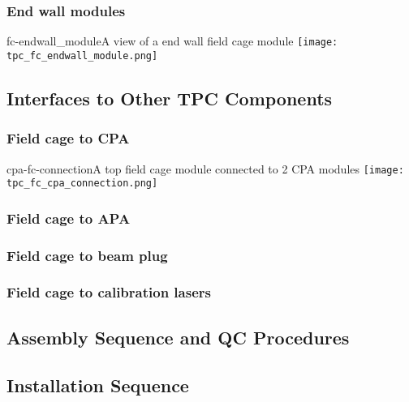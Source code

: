 \subsubsection{End wall modules}

\begin{cdrfigure}{fc-endwall_module}{A view of a end wall field cage module}
\texttt{[image: tpc\_fc\_endwall\_module.png]}
\end{cdrfigure}


\subsection{Interfaces to Other TPC Components}

\subsubsection{Field cage to CPA}

\begin{cdrfigure}{cpa-fc-connection}{A top field cage module connected to 2 CPA modules}
\texttt{[image: tpc\_fc\_cpa\_connection.png]}
\end{cdrfigure}


\subsubsection{Field cage to APA}

\subsubsection{Field cage to beam plug}

\subsubsection{Field cage to calibration lasers}



\subsection{Assembly Sequence and QC Procedures}


\subsection{Installation Sequence}



 


